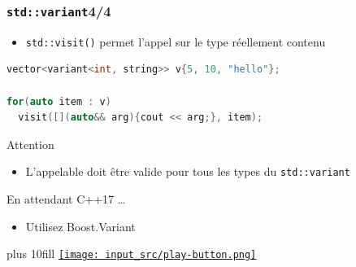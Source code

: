 \documentclass[C++.tex]{subfiles}
\begin{document}
\begin{frame}[fragile]
	\frametitle{\lstinline|std::variant|\titlehfill{}4/4}
	\begin{itemize}
		\item \lstinline|std::visit()| permet l'appel sur le type réellement contenu
	\end{itemize}

	\begin{lstlisting}[language=C++]
vector<variant<int, string>> v{5, 10, "hello"};

for(auto item : v)
  visit([](auto&& arg){cout << arg;}, item);\end{lstlisting}

	\begin{alertblock}{Attention}
		\begin{itemize}
			\item L'appelable doit être valide pour tous les types du \lstinline|std::variant|
		\end{itemize} 

	\end{alertblock}

	\begin{block}{En attendant C++17 \ldots}
		\begin{itemize}
			\item Utilisez Boost.Variant
		\end{itemize}
	\end{block}

	\vskip 10mm plus 10fill
	\hfill
	\href{https://godbolt.org/#z:OYLghAFBqd5QCxAYwPYBMCmBRdBLAF1QCcAaPECAMzwBtMA7AQwFtMQByARg9KtQYEAysib0QXACx8BBAKoBnTAAUAHpwAMvAFYTStJg1DIApACYAQuYukl9ZATwDKjdAGFUtAK4sGe1wAyeAyYAHI%2BAEaYxCAAzADspAAOqAqETgwe3r56KWmOAkEh4SxRMQm2mPYFDEIETMQEWT5%2BXJXVGXUNBEVhkdFxiQr1jc05bcPdvSVlgwCUtqhexMjsHOaxwcjeWADUJrFuTsPEmKwH2CYaAIIbWzuY%2B4cnwcAXV7dmmwzbXnsHbgAbpgHCR3jc7j8Hk8gQ08IYCODbjdggRdiwmMEIHMPiZ4lYbrt9viPkSicN0CAQIC4QiAajSLsqLRUEwCIyKVSXkYLrtAYyAO4HAnXMl8p4AEX2ZjMqgAngAvBVy8xmYWkskU3ZUtBeNEAgG7TkgYCYRHPAiUkDct6xbAQQFzGGGsDrACsbgYrvVEMJZMBkt2XDVsRFYq1OqW%2BsOhuNpvNR0EFwdToNh123o9XvWodxfqJAsDgJ9os1lu1KCjzvTcbN9KTdogAtTMfTmc93tzvs%2Bmyouw0GvJlqp8YB6CWEXoycdJfDw5NdcOsWnOK7PdceCoeZ7m/7g6N89Hh2ZrPN9ubJY2G63frxEu3RLxYbLVuBoOIAONNOI8IbifZB5Wja7x2nyT5uoyXAaIyqoIFULKqnel75kyJAQEweqoLshCYCw2p8jiKFDq%2BeD5BAJhulYboSuhmHmAAbAxuwNMAOL4saurRm4hosdWbgZhwAnqvEEqMjhLCrs%2BxGRnqfFCVmnbPkhEIiR8HALLQnBurwfgcFopCoJw3GWNYRpLCsjwbDwpAEJo6kLAA1iAbrQZpHCSDpdkGZwvAKCA0G2Xp6mkHAsBIJgqggphZAUOhxDAAoyiGFUQgIKgAq6dZaAsEkdBshkSUhLQqXpbp%2BnZbl9AxMAXDBqQFV0NEADyeolRlXkRSC1zxX5HC8J1yB1Pgum8PwggiGI7BSDIgiKCo6hBaQuhtAYRgoNY1j6HgER%2BbAzBsCAESoKk7LAjE3DxNpcwLKgSQ1L1AC0FIHBKpgmZYXDxL55mrHoFLBIVKVpe13C8AQpxrNZArEEwSR2RpWmeYthkcNgkXINFuyqAAHPRD30ZIuzAMgyBBlwAB0Zi7BAxlWJYjK4IQJDSrEXBzGD8MLHBTBYDE2KkE5Ln6JwHmkGVvAo75/k2ZzwscGYSP6ZLMtBddpBnWkziSEAA%3D%3D%3D}{\texttt{[image: input\_src/play-button.png]}}
\end{frame}
\end{document}

